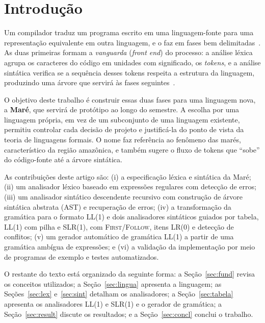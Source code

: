 \documentclass[conference]{IEEEtran}
\begin{document}
\section{Introdução}

Um compilador traduz um programa escrito em uma linguagem-fonte para uma
representação equivalente em outra linguagem, e o faz em fases bem
delimitadas~\cite{aho2006}. As duas primeiras formam a \emph{vanguarda}
(\textit{front end}) do processo: a análise léxica agrupa os caracteres do
código em unidades com significado, os \emph{tokens}, e a análise sintática
verifica se a sequência desses tokens respeita a estrutura da linguagem,
produzindo uma árvore que servirá às fases seguintes~\cite{cooper2011}.

O objetivo deste trabalho é construir essas duas fases para uma linguagem
nova, a \textbf{Maré}, que servirá de protótipo ao longo do semestre. A
escolha por uma linguagem própria, em vez de um subconjunto de uma linguagem
existente, permitiu controlar cada decisão de projeto e justificá-la do ponto
de vista da teoria de linguagens formais. O nome faz referência ao fenômeno
das marés, característico da região amazônica, e também sugere o fluxo de
tokens que ``sobe'' do código-fonte até a árvore sintática.

As contribuições deste artigo são: (i) a especificação léxica e sintática da
Maré; (ii) um analisador léxico baseado em expressões regulares com detecção
de erros; (iii) um analisador sintático descendente recursivo com construção
de árvore sintática abstrata (AST) e recuperação de erros; (iv) a transformação da gramática para o formato LL(1) e dois analisadores
sintáticos guiados por tabela, LL(1) com pilha e SLR(1), com \textsc{First}/\textsc{Follow},
itens LR(0) e detecção de conflitos; (v) um gerador automático de gramática
LL(1) a partir de uma gramática ambígua de expressões; e (vi) a validação da
implementação por meio de programas de exemplo e testes automatizados.

O restante do texto está organizado da seguinte forma: a Seção~\ref{sec:fund}
revisa os conceitos utilizados; a Seção~\ref{sec:lingua} apresenta a
linguagem; as Seções~\ref{sec:lex} e~\ref{sec:sint} detalham os analisadores;
a Seção~\ref{sec:tabela} apresenta os analisadores LL(1) e SLR(1) e o gerador de gramática; a Seção~\ref{sec:result} discute os resultados; e a Seção~\ref{sec:concl}
conclui o trabalho.

\end{document}
